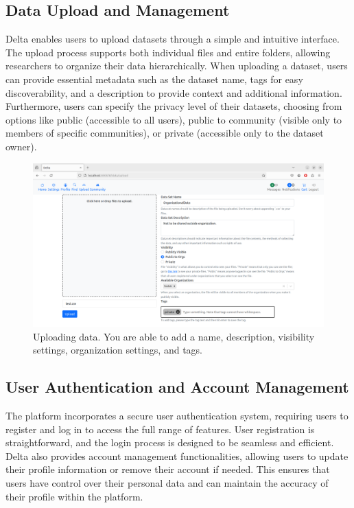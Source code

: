 \documentclass[conference]{IEEEtran}
\begin{document}
\subsection{Data Upload and Management}
Delta enables users to upload datasets through a simple and intuitive interface. The upload process supports both individual files and entire folders, allowing researchers to organize their data hierarchically. When uploading a dataset, users can provide essential metadata such as the dataset name, tags for easy discoverability, and a description to provide context and additional information. Furthermore, users can specify the privacy level of their datasets, choosing from options like public (accessible to all users), public to community (visible only to members of specific communities), or private (accessible only to the dataset owner).
\begin{figure}[h]
  \centering
  \includegraphics[width=\columnwidth]{figures/upload_page.png}
  \caption{Uploading data. You are able to add a name, description, visibility settings, organization settings, and tags.}
  \label{fig:delta-upload}
\end{figure}

\subsection{User Authentication and Account Management}
The platform incorporates a secure user authentication system, requiring users to register and log in to access the full range of features. User registration is straightforward, and the login process is designed to be seamless and efficient. Delta also provides account management functionalities, allowing users to update their profile information or remove their account if needed. This ensures that users have control over their personal data and can maintain the accuracy of their profile within the platform.
\end{document}
